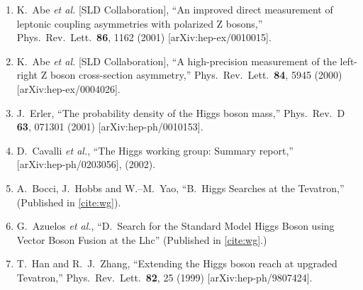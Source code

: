 \documentclass[12pt]{article}
\def\lhc{{\sc Lhc}}
\begin{document}
\begin{flushleft}
\begin{enumerate}
    \item K.~Abe {\it et al.} [SLD Collaboration],
    ``An improved direct measurement of leptonic coupling asymmetries
    with polarized Z bosons,''
    Phys.\ Rev.\ Lett.\  {\bf 86}, 1162 (2001)
    [arXiv:hep-ex/0010015].
    \label{cite:sld_leptons}
  
    \item K.~Abe {\it et al.} [SLD Collaboration],
    ``A high-precision measurement of the left-right Z boson cross-section  asymmetry,''
    Phys.\ Rev.\ Lett.\  {\bf 84}, 5945 (2000)
    [arXiv:hep-ex/0004026].
    \label{cite:sld_hadrons}
  
    \item J.~Erler,
    ``The probability density of the Higgs boson mass,''
    Phys.\ Rev.\ D {\bf 63}, 071301 (2001)
    [arXiv:hep-ph/0010153].
    \label{cite:mass_pdf}
  
    \item D.~Cavalli {\it et al.},
    ``The Higgs working group: Summary report,'' \\
    \mbox{[}arXiv:hep-ph/0203056\mbox{]}, (2002).
    \label{cite:wg}
  
    \item A.~Bocci, J.~Hobbs and W.--M.~Yao, ``B.~Higgs Searches at the
    Tevatron,'' (Published in \ref{cite:wg}).
    \label{cite:wg_tevatron}
  
    \item G.~Azuelos {\it et al.}, ``D.~Search for the Standard Model
    Higgs Boson using Vector Boson Fusion at the \lhc'' (Published in
    \ref{cite:wg}.)
    \label{cite:wg_lhc}
  
    \item T.~Han and R.~J.~Zhang,
    ``Extending the Higgs boson reach at upgraded Tevatron,''
    Phys.\ Rev.\ Lett.\  {\bf 82}, 25 (1999)
    [arXiv:hep-ph/9807424].
    \label{cite:wg_supplemental}
  
  \end{enumerate}
\end{flushleft}
\end{document}
